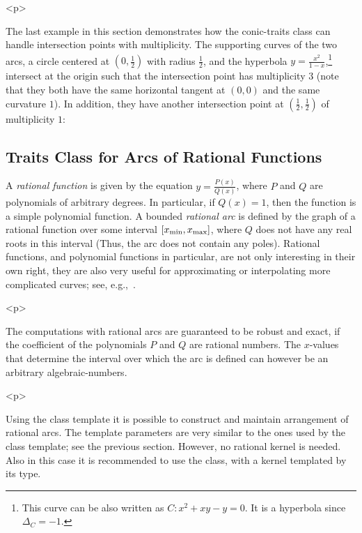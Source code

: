 
\begin{ccHtmlOnly}<p>\end{ccHtmlOnly}
The last example in this section demonstrates how the conic-traits
class can handle intersection points with multiplicity. The
supporting curves of the two arcs, a circle centered at
$(0,\frac{1}{2})$ with radius $\frac{1}{2}$, and the hyperbola $y
= \frac{x^2}{1-x}$,\footnote{This curve can be also written as $C:
x^2 + xy - y = 0$. It is a hyperbola since $\Delta_{C} = -1$.}
intersect at the origin such that the intersection point has
multiplicity $3$ (note that they both have the same horizontal
tangent at $(0,0)$ and the same curvature $1$). In addition, they
have another intersection point at $(\frac{1}{2},\frac{1}{2})$ of
multiplicity $1$:


\subsection{Traits Class for Arcs of Rational Functions}
\label{arr_ssec:tr_ratfunc}
%
A {\em rational function} is given by the equation $y =
\frac{P(x)}{Q(x)}$, where $P$ and $Q$ are polynomials of arbitrary
degrees. In particular, if $Q(x) = 1$, then the function is a
simple polynomial function. A bounded {\em rational arc} is
defined by the graph of a rational function over some interval
$[x_{\rm min}, x_{\rm max}]$, where $Q$ does not have any real
roots in this interval (Thus, the arc does not contain any poles).
Rational functions, and polynomial functions in particular, are
not only interesting in their own right, they are also very useful
for approximating or interpolating more complicated curves; see,
e.g.,~\cite[Chapter~3]{cgal:ptvf-nrcpp-02}.

\begin{ccHtmlOnly}<p>\end{ccHtmlOnly}
The computations with rational arcs are guaranteed to be robust and 
exact, if the coefficient of the polynomials $P$ and $Q$ are rational 
numbers. The $x$-values that determine the interval over which the 
arc is defined can however be an arbitrary algebraic-numbers.

\begin{ccHtmlOnly}<p>\end{ccHtmlOnly}
Using the  class
template it is possible to construct and maintain arrangement of
rational arcs. The template parameters are very similar to the
ones used by the  class template; see
the previous section. However, no rational kernel is needed. Also
in this case it is recommended to use the
 class, with a kernel templated
by its  type.

